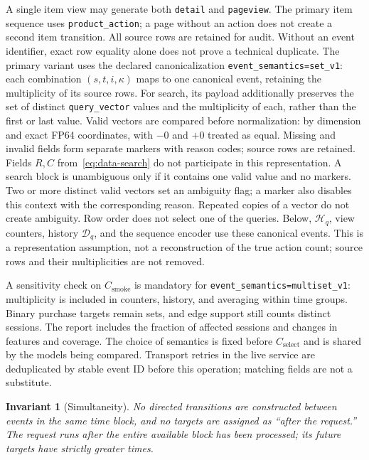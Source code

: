\documentclass[12pt,a4paper]{article}
\newcommand{\code}[1]{{\ttfamily\small\nolinkurl{#1}}}
\theoremstyle{plainru}
\newtheorem{invariant}{Invariant}[section]
\begin{document}
A single item view may generate both \code{detail} and
\code{pageview}. The primary item sequence uses
\code{product_action}; a page without an action does not create a second
item transition. All source rows are retained for audit.
Without an event identifier, exact row equality alone
does not prove a technical duplicate. The primary variant uses the declared
canonicalization \code{event_semantics=set_v1}: each combination
\((s,t,i,\kappa)\) maps to one canonical event, retaining the
multiplicity of its source rows. For search, its payload additionally
preserves the set of distinct \code{query_vector} values and the multiplicity
of each, rather than the first or last value.
\label{sec:data-search-canonicalization}
Valid vectors are compared before normalization: by dimension and exact
FP64 coordinates, with $-0$ and $+0$ treated as equal. Missing and
invalid fields form separate markers with reason codes;
source rows are retained.
Fields $R,C$ from~\eqref{eq:data-search} do not participate in this representation.
A search block is unambiguous only if it contains one valid value
and no markers. Two or more distinct valid vectors set
an ambiguity flag; a marker also disables this context
with the corresponding reason. Repeated copies of a vector do not create
ambiguity. Row order does not select one of the queries.
Below, $\mathcal H_q$, view counters,
history $\mathcal D_q$, and the sequence encoder use these
canonical events. This is a representation assumption, not a reconstruction
of the true action count; source rows and their multiplicities are not removed.

A sensitivity check on $C_{\mathrm{smoke}}$ is mandatory for
\code{event_semantics=multiset_v1}: multiplicity is included in counters,
history, and averaging within time groups. Binary purchase targets remain
sets, and edge support still counts distinct sessions.
The report includes the fraction of affected sessions and changes in features and coverage.
The choice of semantics is fixed before $C_{\mathrm{select}}$ and is shared by
the models being compared. Transport retries in the live service are deduplicated by
stable event ID before this operation; matching fields are not a substitute.

\begin{invariant}[Simultaneity]
No directed transitions are constructed between events in the same time block,
and no targets are assigned as ``after the request.'' The request runs
after the entire available block has been processed; its future targets have
strictly greater times.
\end{invariant}
\end{document}
